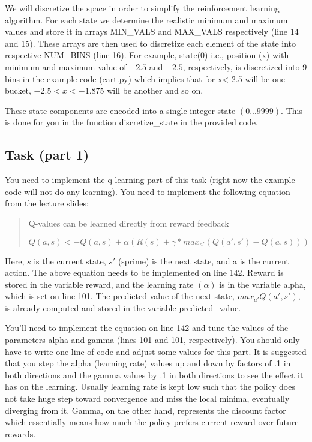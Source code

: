 \documentclass[twoside,10pt]{article}
\begin{document}
We will discretize the space in order to simplify the reinforcement
learning algorithm. For each state we determine the realistic minimum
and maximum values and store it in arrays MIN\_VALS and MAX\_VALS
respectively (line 14 and 15). These arrays are then used to discretize
each element of the state into respective NUM\_BINS (line 16). For
example, state(0) i.e., position (x) with minimum and maximum value of
\(-2.5\) and \(+2.5\), respectively, is discretized into 9 bins in the
example code (cart.py) which implies that for x\textless{}-2.5 will be
one bucket, \(-2.5<x<-1.875\) will be another and so on.

These state components are encoded into a single integer state
\((0 ... 9999)\). This is done for you in the function discretize\_state
in the provided code.


\subsection*{Task (part 1)}\label{task-part-1}

You need to implement the q-learning part of this task (right now the
example code will not do any learning). You need to implement the
following equation from the lecture slides:

\begin{quote}
    Q-values can be learned directly from reward feedback

    \[Q(a,s) <- Q(a,s) + \alpha(R(s) + \gamma * max_{a'}(Q(a',s') - Q(a,s)))\]
\end{quote}

Here, \(s\) is the current state, \(s'\) (sprime) is the next state, and
a is the current action. The above equation needs to be implemented on
line 142. Reward is stored in the variable reward, and the learning rate
\((\alpha)\) is in the variable alpha, which is set on line 101. The
predicted value of the next state, \(max_{a'}Q(a',s')\), is already
computed and stored in the variable predicted\_value.

You'll need to implement the equation on line 142 and tune the values of
the parameters alpha and gamma (lines 101 and 101, respectively). You
should only have to write one line of code and adjust some values for
this part. It is suggested that you step the alpha (learning rate)
values up and down by factors of .1 in both directions and the gamma
values by .1 in both directions to see the effect it has on the
learning. Usually learning rate is kept low such that the policy does
not take huge step toward convergence and miss the local minima,
eventually diverging from it. Gamma, on the other hand, represents the
discount factor which essentially means how much the policy prefers
current reward over future rewards.
\end{document}
